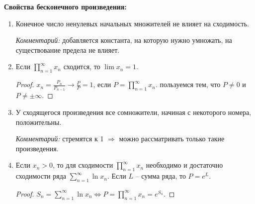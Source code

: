 \begin{statement} \textbf{Свойства бесконечного произведения:}
    \begin{enumerate}
        \item Конечное число ненулевых начальных множителей не влияет на сходимость.

        \textit{Комментарий:} добавляется константа, на которую нужно умножать, на существование предела не влияет.
        \item Если $\prod \limits_{n=1}^\infty x_n$ сходится, то $\lim x_n =1$.

        \begin{proof}
            $x_n=\frac{P_n}{P_{n-1}}\rightarrow \frac{P}{P}=1$, если $P=\prod \limits_{n=1}^\infty x_n$. пользуемся тем, что $P\neq 0$ и $P\neq \pm \infty$.
        \end{proof}
        \item У сходящегося произведения все сомножители, начиная с некоторого номера, положительны.

        \textit{Комментарий:} стремятся к 1 $\Rightarrow$ можно рассматривать только такие произведения.

        \item Если $x_n>0$, то для сходимости $\prod \limits_{n=1}^\infty x_n$ необходимо и достаточно сходимости ряда $\sum \limits_{n=1}^\infty\ln x_n$. Если $L$ – сумма ряда, то $P=e^L$.

        \begin{proof}
            $S_n=\sum \limits_{n=1}^\infty\ln x_n\Leftrightarrow P=\prod \limits_{n=1}^\infty x_n=e^{S_n}$.
        \end{proof}
    \end{enumerate}
\end{statement}

